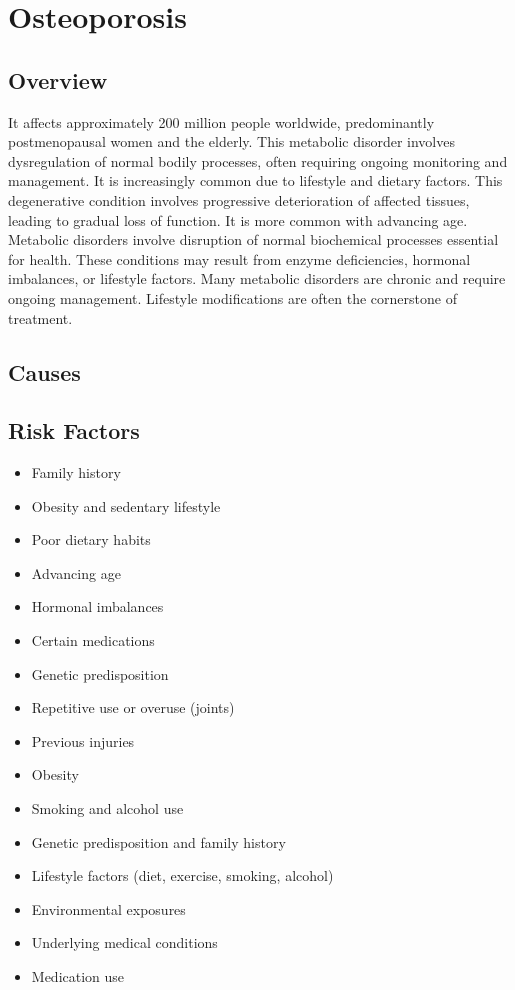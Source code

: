 \chapter{Osteoporosis}
\label{sec:Osteoporosis}

\section{Overview}
It affects approximately 200 million people worldwide, predominantly postmenopausal women and the elderly. This metabolic disorder involves dysregulation of normal bodily processes, often requiring ongoing monitoring and management. It is increasingly common due to lifestyle and dietary factors. This degenerative condition involves progressive deterioration of affected tissues, leading to gradual loss of function. It is more common with advancing age. Metabolic disorders involve disruption of normal biochemical processes essential for health. These conditions may result from enzyme deficiencies, hormonal imbalances, or lifestyle factors. Many metabolic disorders are chronic and require ongoing management. Lifestyle modifications are often the cornerstone of treatment.
\section{Causes}
\section{Risk Factors}

\begin{itemize}[noitemsep]
  \item Family history
  \item Obesity and sedentary lifestyle
  \item Poor dietary habits
  \item Advancing age
  \item Hormonal imbalances
  \item Certain medications
  \item Genetic predisposition
  \item Repetitive use or overuse (joints)
  \item Previous injuries
  \item Obesity
  \item Smoking and alcohol use
  \item Genetic predisposition and family history
  \item Lifestyle factors (diet, exercise, smoking, alcohol)
  \item Environmental exposures
  \item Underlying medical conditions
  \item Medication use
\end{itemize}
